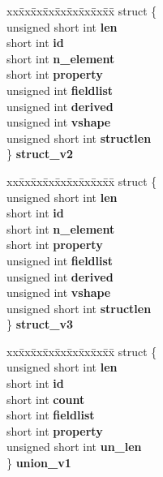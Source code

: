 \begin{DoxyCompactItemize}
\begin{tabbing}
\end{tabbing}\item 
\mbox{\label{unioncodeview__type_a5887a41cee98a3164b1613143e2b630d}} 
\begin{tabbing}
xx\=xx\=xx\=xx\=xx\=xx\=xx\=xx\=xx\=\kill
struct \{\\
\>unsigned short int {\bfseries len}\\
\>short int {\bfseries id}\\
\>short int {\bfseries n\_element}\\
\>short int {\bfseries property}\\
\>unsigned int {\bfseries fieldlist}\\
\>unsigned int {\bfseries derived}\\
\>unsigned int {\bfseries vshape}\\
\>unsigned short int {\bfseries structlen}\\
\} {\bfseries struct\_v2}\\

\end{tabbing}\item 
\mbox{\label{unioncodeview__type_a2fc45e2d33d3104ff59f5d43861cd43f}} 
\begin{tabbing}
xx\=xx\=xx\=xx\=xx\=xx\=xx\=xx\=xx\=\kill
struct \{\\
\>unsigned short int {\bfseries len}\\
\>short int {\bfseries id}\\
\>short int {\bfseries n\_element}\\
\>short int {\bfseries property}\\
\>unsigned int {\bfseries fieldlist}\\
\>unsigned int {\bfseries derived}\\
\>unsigned int {\bfseries vshape}\\
\>unsigned short int {\bfseries structlen}\\
\} {\bfseries struct\_v3}\\

\end{tabbing}\item 
\mbox{\label{unioncodeview__type_a1e086d520f7770cbfc72a2714c5001cc}} 
\begin{tabbing}
xx\=xx\=xx\=xx\=xx\=xx\=xx\=xx\=xx\=\kill
struct \{\\
\>unsigned short int {\bfseries len}\\
\>short int {\bfseries id}\\
\>short int {\bfseries count}\\
\>short int {\bfseries fieldlist}\\
\>short int {\bfseries property}\\
\>unsigned short int {\bfseries un\_len}\\
\} {\bfseries union\_v1}\\


\end{tabbing}
\end{DoxyCompactItemize}

